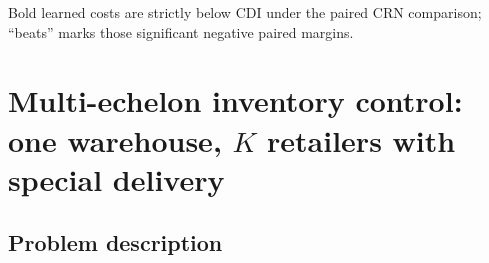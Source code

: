 \documentclass[11pt]{article}
\begin{document}
\begin{table}[!htbp]
\centering
\small
\caption{Dual-sourcing: best learned soft-tree policy vs.\ the capped dual-index (CDI) optimal proxy, common-random-number evaluation ($70$ seeds, horizon $6\times10^4$). $\Delta\%$ is the learned policy's cost relative to CDI (negative is better); the A3C row reports the published optimality gap from \citet{gijsbrechts2022drl}.}
\label{tab:ds-results}
\par\medskip\footnotesize Bold learned costs are strictly below CDI under the paired CRN comparison; ``beats'' marks those significant negative paired margins.
\end{table}
\FloatBarrier

\section{Multi-echelon inventory control: one warehouse, $K$ retailers with special delivery}

\subsection{Problem description}
\end{document}
